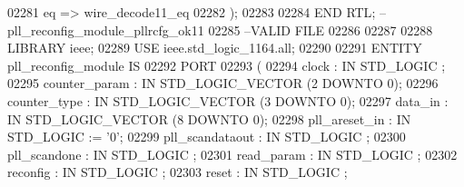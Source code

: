 \begin{DoxyCode}
{02281         eq => wire_decode11_eq
02282       \textcolor{vhdlchar}{)};
02283 
02284  \textcolor{keywordflow}{END} \textcolor{vhdlchar}{RTL};\textcolor{keyword}{ --pll\_reconfig\_module\_pllrcfg\_ok11}
02285 \textcolor{keyword}{--VALID FILE}
02286 
02287 
02288 \textcolor{vhdlkeyword}{LIBRARY }\textcolor{keywordflow}{ieee};
02289 \textcolor{vhdlkeyword}{USE }ieee.std\_logic\_1164.\textcolor{keywordflow}{all};
02290 
02291 \textcolor{keywordflow}{ENTITY }pll_reconfig_module \textcolor{keywordflow}{IS}
02292     \textcolor{keywordflow}{PORT}
02293     \textcolor{vhdlchar}{(}
02294         \textcolor{vhdlchar}{clock}       \textcolor{vhdlchar}{:} \textcolor{keywordflow}{IN} \textcolor{comment}{STD\_LOGIC} ;
02295         \textcolor{vhdlchar}{counter_param}       \textcolor{vhdlchar}{:} \textcolor{keywordflow}{IN} \textcolor{comment}{STD\_LOGIC\_VECTOR} \textcolor{vhdlchar}{(}\textcolor{vhdllogic}{}\textcolor{vhdllogic}{2} \textcolor{keywordflow}{DOWNTO} \textcolor{vhdllogic}{}\textcolor{vhdllogic}{0}\textcolor{vhdlchar}{)};
02296         \textcolor{vhdlchar}{counter_type}        \textcolor{vhdlchar}{:} \textcolor{keywordflow}{IN} \textcolor{comment}{STD\_LOGIC\_VECTOR} \textcolor{vhdlchar}{(}\textcolor{vhdllogic}{}\textcolor{vhdllogic}{3} \textcolor{keywordflow}{DOWNTO} \textcolor{vhdllogic}{}\textcolor{vhdllogic}{0}\textcolor{vhdlchar}{)};
02297         \textcolor{vhdlchar}{data_in}     \textcolor{vhdlchar}{:} \textcolor{keywordflow}{IN} \textcolor{comment}{STD\_LOGIC\_VECTOR} \textcolor{vhdlchar}{(}\textcolor{vhdllogic}{}\textcolor{vhdllogic}{8} \textcolor{keywordflow}{DOWNTO} \textcolor{vhdllogic}{}\textcolor{vhdllogic}{0}\textcolor{vhdlchar}{)};
02298         \textcolor{vhdlchar}{pll_areset_in}       \textcolor{vhdlchar}{:} \textcolor{keywordflow}{IN} \textcolor{comment}{STD\_LOGIC}  \textcolor{vhdlchar}{:=} \textcolor{vhdlchar}{'}\textcolor{vhdllogic}{}\textcolor{vhdllogic}{0}\textcolor{vhdlchar}{'};
02299         \textcolor{vhdlchar}{pll_scandataout}     \textcolor{vhdlchar}{:} \textcolor{keywordflow}{IN} \textcolor{comment}{STD\_LOGIC} ;
02300         \textcolor{vhdlchar}{pll_scandone}        \textcolor{vhdlchar}{:} \textcolor{keywordflow}{IN} \textcolor{comment}{STD\_LOGIC} ;
02301         \textcolor{vhdlchar}{read_param}      \textcolor{vhdlchar}{:} \textcolor{keywordflow}{IN} \textcolor{comment}{STD\_LOGIC} ;
02302         \textcolor{vhdlchar}{reconfig}        \textcolor{vhdlchar}{:} \textcolor{keywordflow}{IN} \textcolor{comment}{STD\_LOGIC} ;
02303         \textcolor{vhdlchar}{reset}       \textcolor{vhdlchar}{:} \textcolor{keywordflow}{IN} \textcolor{comment}{STD\_LOGIC} ;
}
\end{DoxyCode}
